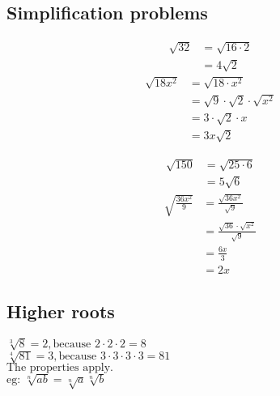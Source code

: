 \documentclass{hw}
\begin{document}
\subsection*{\normalsize Simplification problems}
\begin{minipage}{0.5\textwidth}
\centering
    \begin{align*}
        \sqrt{32} &= \sqrt{16 \cdot 2} \\
                    &= 4\sqrt{2}
    \end{align*}
    \begin{align*}
        \sqrt{18x^2} &= \sqrt{18 \cdot x^2} \\
                     &= \sqrt{9} \cdot \sqrt{2} \cdot \sqrt{x^2} \\
                     &= 3 \cdot \sqrt{2} \cdot x \\
                     &= 3x\sqrt{2}
        \end{align*}

\end{minipage}
\begin{minipage}{0.5\textwidth}
\centering
    \begin{align*}
        \sqrt{150}  &= \sqrt{25 \cdot 6} \\
                    &= 5\sqrt{6}
    \end{align*}
    \begin{align*}
        \sqrt{\frac{36x^2}{9}} &= \frac{\sqrt{36x^2}}{\sqrt{9}} \\
                        &= \frac{\sqrt{36} \cdot \sqrt{x^2}}{\sqrt{9}} \\
                        &= \frac{6x}{3} \\
                        &= 2x
    \end{align*}
\end{minipage}

\subsection*{\normalsize Higher roots}
$\sqrt[3]{8} = 2, \text{because } 2 \cdot 2 \cdot 2 = 8$ \\
$\sqrt[4]{81} = 3, \text{because } 3 \cdot 3 \cdot 3 \cdot 3 = 81$ \\

$\text{The properties apply.}$\\
$\text{eg: }\sqrt[n]{ab} = \sqrt[n]{a}\sqrt[n]{b}$
\end{document}
